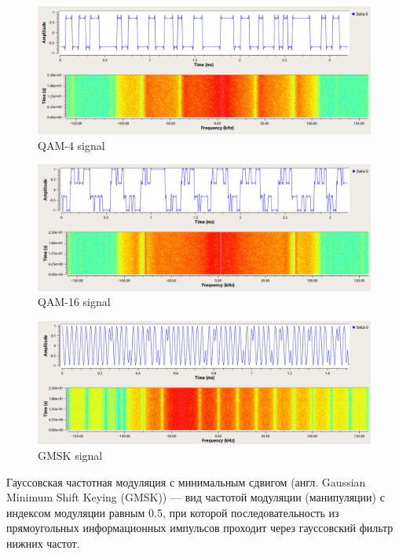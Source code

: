 \begin{figure}[!htb]
	\includegraphics[width=\linewidth]{pics/QAM-4_SIG}
	\caption{QAM-4 signal}\label{fig:QAM-4}
	\endminipage\hfill
\end{figure}
\begin{figure}[!htb]
	\includegraphics[width=\linewidth]{pics/QAM-16_SIG}
	\caption{QAM-16 signal}\label{fig:QAM-16}
	\endminipage\hfill
\end{figure}

\begin{figure}[!htb]
	\begin{center}
		\includegraphics[width=\linewidth]{pics/GMSK-SIG}
		\caption{GMSK signal}
		\label{fig:GMSK}
	\end{center}
\end{figure}

Гауссовская частотная модуляция с минимальным сдвигом (англ. Gaussian Minimum Shift Keying (GMSK)) — вид частотой модуляции (манипуляции) с индексом модуляции равным 0.5, при которой последовательность из прямоугольных информационных импульсов проходит через гауссовский фильтр нижних частот.

